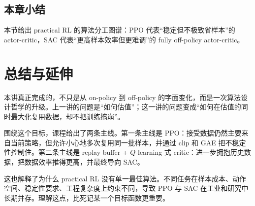 \documentclass[a4paper]{article}
\begin{document}
\subsection{本章小结}
本节给出 practical RL 的算法分工图谱：PPO 代表“稳定但不极致省样本”的 actor-critic，SAC 代表“更高样本效率但更难调”的 fully off-policy actor-critic。

\section{总结与延伸}
本讲真正完成的，不只是从 on-policy 到 off-policy 的字面变化，而是一次算法设计哲学的升级。上一讲的问题是“如何估值”；这一讲的问题变成“如何在估值的同时最大化复用数据，却不把训练搞崩”。

围绕这个目标，课程给出了两条主线。第一条主线是 PPO：接受数据仍然主要来自当前策略，但允许小心地多次复用同一批样本，并通过 clip 和 GAE 把不稳定性控制住。第二条主线是 replay buffer + \(Q\)-learning 式 critic：进一步拥抱历史数据，把数据效率推得更高，并最终导向 SAC。

这也解释了为什么 practical RL 没有单一最佳算法。不同任务在样本成本、动作空间、稳定性要求、工程复杂度上约束不同，导致 PPO 与 SAC 在工业和研究中长期并存。理解这点，比死记某一个目标函数更重要。
\end{document}
